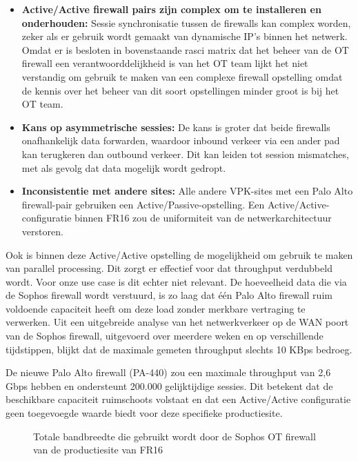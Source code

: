 \begin{itemize}
    \item \textbf{Active/Active firewall pairs zijn complex om te installeren en onderhouden:}  Sessie synchronisatie tussen de firewalls kan complex worden, zeker als er gebruik wordt gemaakt van dynamische IP’s binnen het netwerk. Omdat er is besloten in bovenstaande rasci matrix dat het beheer van de OT firewall een verantwoorddelijkheid is van het OT team lijkt het niet verstandig om gebruik te maken van een complexe firewall opstelling omdat de kennis over het beheer van dit soort opstellingen minder groot is bij het OT team. 
    
    \item \textbf{Kans op asymmetrische sessies:} De kans is groter dat beide firewalls onafhankelijk data forwarden, waardoor inbound verkeer via een ander pad kan terugkeren dan outbound verkeer. Dit kan leiden tot session mismatches, met als gevolg dat data mogelijk wordt gedropt.
    
    \item \textbf{Inconsistentie met andere sites:}  Alle andere VPK-sites met een Palo Alto firewall-pair gebruiken een Active/Passive-opstelling. Een Active/Active-configuratie binnen FR16 zou de uniformiteit van de netwerkarchitectuur verstoren.

\end{itemize}

\newpage

Ook is binnen deze Active/Active opstelling de mogelijkheid om gebruik te maken van parallel processing. Dit zorgt er effectief voor dat throughput verdubbeld wordt. \autocite{Fulp2006} Voor onze use case is dit echter niet relevant. De hoeveelheid data die via de Sophos firewall wordt verstuurd, is zo laag dat één Palo Alto firewall ruim voldoende capaciteit heeft om deze load zonder merkbare vertraging te verwerken. Uit een uitgebreide analyse van het netwerkverkeer op de WAN poort van de Sophos firewall, uitgevoerd over meerdere weken en op verschillende tijdstippen, blijkt dat de maximale gemeten throughput slechts 10 KBps bedroeg.


De nieuwe Palo Alto firewall (PA-440) zou een maximale throughput van 2,6 Gbps hebben en ondersteunt 200.000 gelijktijdige sessies. \autocite{PaloAltoDS2025} Dit betekent dat de beschikbare capaciteit ruimschoots volstaat en dat een Active/Active configuratie geen toegevoegde waarde biedt voor deze specifieke productiesite.

\begin{figure}[H]
    \centering
    \caption[Sophos firewall bandwidth graph]{\label{fig:grail}Totale bandbreedte die gebruikt wordt door de Sophos OT firewall van de productiesite van FR16}
\end{figure}




